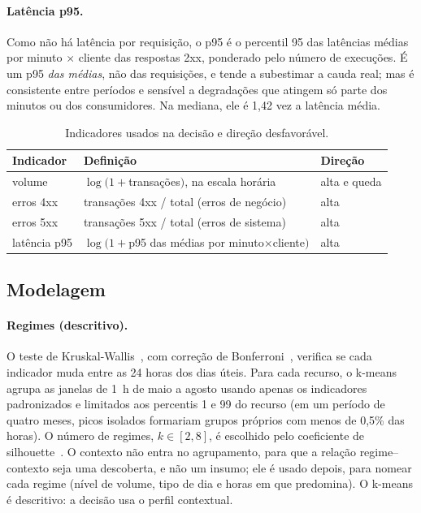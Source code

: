 \documentclass[sigconf,nonacm]{acmart}
\begin{document}
\paragraph{Latência p95.} Como não há latência por requisição, o p95 é o percentil 95 das latências médias por minuto $\times$ cliente das respostas 2xx, ponderado pelo número de execuções. É um p95 \emph{das médias}, não das requisições, e tende a subestimar a cauda real; mas é consistente entre períodos e sensível a degradações que atingem só parte dos minutos ou dos consumidores. Na mediana, ele é 1,42 vez a latência média.


\begin{table}[t]
  \caption{Indicadores usados na decisão e direção desfavorável.}
  \label{tab:atributos}
  \small
  \begin{tabular}{p{}p{}p{}}
    \toprule
    Indicador & Definição & Direção \\
    \midrule
    volume & $\log(1+$transações$)$, na escala horária & alta e queda \\
    erros 4xx & transações 4xx / total (erros de negócio) & alta \\
    erros 5xx & transações 5xx / total (erros de sistema) & alta \\
    latência p95 & $\log(1+$p95 das médias por minuto$\times$cliente$)$ & alta \\
    \bottomrule
  \end{tabular}
\end{table}

\subsection{Modelagem}

\paragraph{Regimes (descritivo).} O teste de Kruskal-Wallis~\citep{kruskal1952ranks}, com correção de Bonferroni~\citep{dunn1961multiple}, verifica se cada indicador muda entre as 24 horas dos dias úteis. Para cada recurso, o k-means~\citep{lloyd1982kmeans} agrupa as janelas de 1~h de maio a agosto usando apenas os indicadores padronizados e limitados aos percentis 1 e 99 do recurso (em um período de quatro meses, picos isolados formariam grupos próprios com menos de 0,5\% das horas). O número de regimes, $k\in[2,8]$, é escolhido pelo coeficiente de silhouette~\citep{rousseeuw1987silhouette}. O contexto não entra no agrupamento, para que a relação regime--contexto seja uma descoberta, e não um insumo; ele é usado depois, para nomear cada regime (nível de volume, tipo de dia e horas em que predomina). O k-means é descritivo: a decisão usa o perfil contextual.
\end{document}
